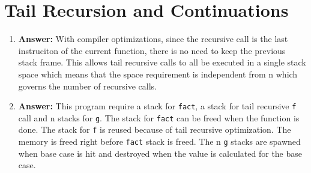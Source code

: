 \documentclass{article}
\begin{document}
\section{Tail Recursion and Continuations}
\begin{enumerate}
	\item \textbf{Answer: }With compiler optimizations, since the recursive call
		is the last instruciton of the current function, there is no need to keep
		the previous stack frame. This allows tail recursive calls to all be
		executed in a single stack space which means that the space requirement is
		independent from n which governs the number of recursive calls.
	\item \textbf{Answer: }This program require a stack for \texttt{fact}, a stack
		for tail recursive \texttt{f} call and n stacks for \texttt{g}. The stack
		for \texttt{fact} can be freed when the function is done. The stack for
		\texttt{f} is reused because of tail recursive optimization. The memory is
		freed right before \texttt{fact} stack is freed. The n \texttt{g} stacks are
		spawned when base case is hit and destroyed when the value is calculated for
		the base case.
\end{enumerate}
\end{document}
